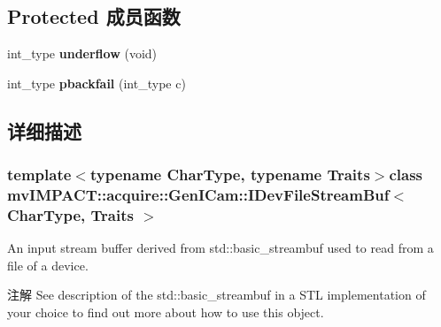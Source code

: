 \subsection*{Protected 成员函数}
\begin{DoxyCompactItemize}
\item 
\hypertarget{classmv_i_m_p_a_c_t_1_1acquire_1_1_gen_i_cam_1_1_i_dev_file_stream_buf_a3af0dc0fddaf00f4be5bfd585d49f01b}{int\+\_\+type {\bfseries underflow} (void)}\label{classmv_i_m_p_a_c_t_1_1acquire_1_1_gen_i_cam_1_1_i_dev_file_stream_buf_a3af0dc0fddaf00f4be5bfd585d49f01b}

\item 
\hypertarget{classmv_i_m_p_a_c_t_1_1acquire_1_1_gen_i_cam_1_1_i_dev_file_stream_buf_a27aaa03e26dd58b103c46f369ef74589}{int\+\_\+type {\bfseries pbackfail} (int\+\_\+type c)}\label{classmv_i_m_p_a_c_t_1_1acquire_1_1_gen_i_cam_1_1_i_dev_file_stream_buf_a27aaa03e26dd58b103c46f369ef74589}

\end{DoxyCompactItemize}


\subsection{详细描述}
\subsubsection*{template$<$typename Char\+Type, typename Traits$>$class mv\+I\+M\+P\+A\+C\+T\+::acquire\+::\+Gen\+I\+Cam\+::\+I\+Dev\+File\+Stream\+Buf$<$ Char\+Type, Traits $>$}

An input stream buffer derived from std\+::basic\+\_\+streambuf used to read from a file of a device. 

\begin{DoxyNote}{注解}
See description of the std\+::basic\+\_\+streambuf in a S\+T\+L implementation of your choice to find out more about how to use this object. 
\end{DoxyNote}


